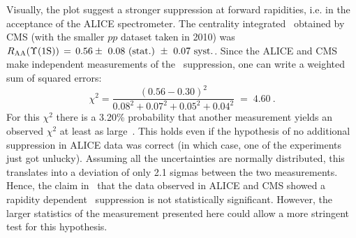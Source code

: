 Visually, the plot suggest a stronger suppression at forward
rapidities, i.e. in the acceptance of the ALICE spectrometer.
 The centrality integrated \RAA\ obtained by CMS (with
the smaller $pp$ dataset taken in 2010) was $\RAA(\PgUa)\,=\,0.56 \pm\ 0.08~\textrm{(stat.)}~\pm\
0.07~\textrm{syst.}$. Since the ALICE and CMS make independent
measurements of the \PgUa\ suppression, one can write a weighted sum
of squared errors:
\begin{equation}
\label{eq:chi2}
\chi^{2} =
\frac{\left(0.56-0.30\right)^{2}}{0.08^{2}+0.07^{2}+0.05^{2}+0.04^{2}}
\;=\;4.60 \: .
\end{equation} For this $\chi^{2}$ there is a 3.20\%
probability that another measurement yields an observed $\chi^{2}$ at
least as large~\cite{root-chi2}. This holds even if the hypothesis of no additional
suppression in ALICE data was correct (in which case, one of the
experiments just got unlucky). Assuming all the uncertainties are
normally distributed, this translates into a deviation of only 2.1 sigmas
between the two measurements. Hence, the claim in~\cite{ALICEUpsilonHI} that the data observed in
ALICE and CMS showed a rapidity dependent \PgUa\ suppression is not
statistically significant. However, the larger statistics of the
measurement presented here could allow a more stringent test for this hypothesis.



